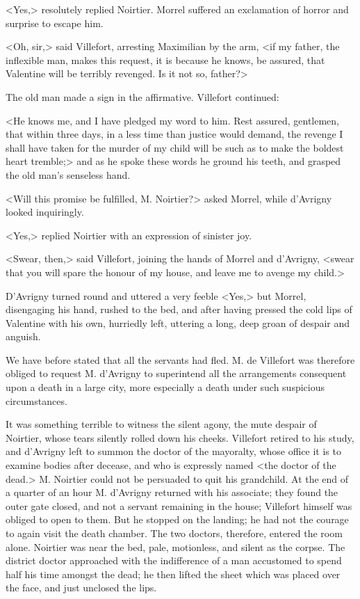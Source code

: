  <Yes,> resolutely replied Noirtier. Morrel suffered an exclamation of horror and surprise to escape him. 

 <Oh, sir,> said Villefort, arresting Maximilian by the arm, <if my father, the inflexible man, makes this request, it is because he knows, be assured, that Valentine will be terribly revenged. Is it not so, father?> 

 The old man made a sign in the affirmative. Villefort continued: 

 <He knows me, and I have pledged my word to him. Rest assured, gentlemen, that within three days, in a less time than justice would demand, the revenge I shall have taken for the murder of my child will be such as to make the boldest heart tremble;> and as he spoke these words he ground his teeth, and grasped the old man's senseless hand. 

 <Will this promise be fulfilled, M. Noirtier?> asked Morrel, while d'Avrigny looked inquiringly. 

 <Yes,> replied Noirtier with an expression of sinister joy. 

 <Swear, then,> said Villefort, joining the hands of Morrel and d'Avrigny, <swear that you will spare the honour of my house, and leave me to avenge my child.> 

 D'Avrigny turned round and uttered a very feeble <Yes,> but Morrel, disengaging his hand, rushed to the bed, and after having pressed the cold lips of Valentine with his own, hurriedly left, uttering a long, deep groan of despair and anguish. 

 We have before stated that all the servants had fled. M. de Villefort was therefore obliged to request M. d'Avrigny to superintend all the arrangements consequent upon a death in a large city, more especially a death under such suspicious circumstances. 

 It was something terrible to witness the silent agony, the mute despair of Noirtier, whose tears silently rolled down his cheeks. Villefort retired to his study, and d'Avrigny left to summon the doctor of the mayoralty, whose office it is to examine bodies after decease, and who is expressly named <the doctor of the dead.> M. Noirtier could not be persuaded to quit his grandchild. At the end of a quarter of an hour M. d'Avrigny returned with his associate; they found the outer gate closed, and not a servant remaining in the house; Villefort himself was obliged to open to them. But he stopped on the landing; he had not the courage to again visit the death chamber. The two doctors, therefore, entered the room alone. Noirtier was near the bed, pale, motionless, and silent as the corpse. The district doctor approached with the indifference of a man accustomed to spend half his time amongst the dead; he then lifted the sheet which was placed over the face, and just unclosed the lips. 

